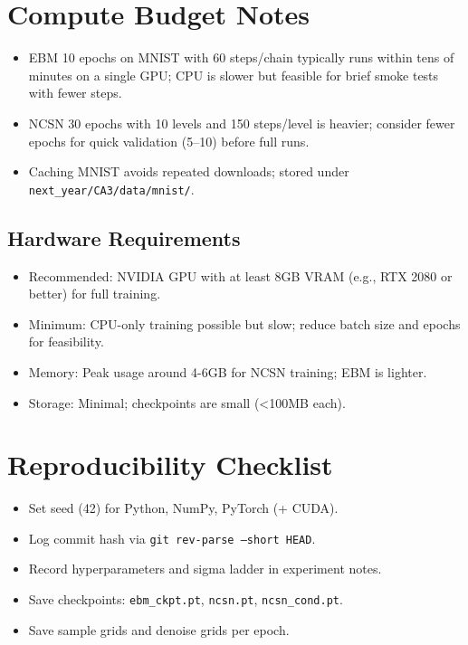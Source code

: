 \documentclass[a4paper,12pt]{article}
\begin{document}
\section{Compute Budget Notes}
\begin{itemize}[leftmargin=*]
    \item EBM 10 epochs on MNIST with 60 steps/chain typically runs within tens of minutes on a single GPU; CPU is slower but feasible for brief smoke tests with fewer steps.
    \item NCSN 30 epochs with 10 levels and 150 steps/level is heavier; consider fewer epochs for quick validation (5--10) before full runs.
    \item Caching MNIST avoids repeated downloads; stored under \texttt{next\_year/CA3/data/mnist/}.
\end{itemize}

\subsection{Hardware Requirements}
\begin{itemize}[leftmargin=*]
    \item Recommended: NVIDIA GPU with at least 8GB VRAM (e.g., RTX 2080 or better) for full training.
    \item Minimum: CPU-only training possible but slow; reduce batch size and epochs for feasibility.
    \item Memory: Peak usage around 4-6GB for NCSN training; EBM is lighter.
    \item Storage: Minimal; checkpoints are small (<100MB each).
\end{itemize}

\section{Reproducibility Checklist}
\begin{itemize}[leftmargin=*]
    \item Set seed (42) for Python, NumPy, PyTorch (+ CUDA).
    \item Log commit hash via \texttt{git rev-parse --short HEAD}.
    \item Record hyperparameters and sigma ladder in experiment notes.
    \item Save checkpoints: \texttt{ebm\_ckpt.pt}, \texttt{ncsn.pt}, \texttt{ncsn\_cond.pt}.
    \item Save sample grids and denoise grids per epoch.
\end{itemize}
\end{document}
